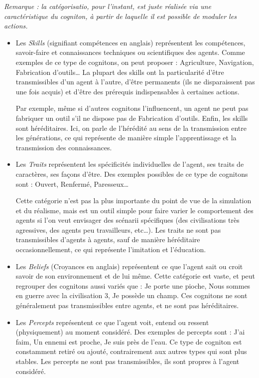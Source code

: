 \documentclass[a4paper,oneside,12 pt]{article}
\begin{document}
	
	\textit{Remarque : la catégorisatio, pour l'instant, est juste réalisée via une caractéristique du cogniton, à partir de laquelle il est possible de moduler les actions.}
\begin{itemize}


\item 	Les\textit{ Skills} (signifiant compétences en anglais) représentent les compétences, savoir-faire et connaissances techniques ou scientifiques des agents. Comme exemples de ce type de cognitons, on peut proposer : Agriculture, Navigation, Fabrication d'outils… La plupart des skills ont la particularité d'être transmissibles d'un agent à l'autre, d'être permanents (ils ne disparaissent pas une fois acquis) et d'être des prérequis indispensables à certaines actions. 
	
	Par exemple, même si d'autres cognitons l'influencent, un agent ne peut pas fabriquer un outil s'il ne dispose pas de Fabrication d'outils. Enfin, les skills sont héréditaires. Ici, on parle de l'hérédité au sens de la transmission entre les générations, ce qui représente de manière simple l'apprentissage et la transmission des connaissances.

\item 	Les \textit{Traits} représentent les spécificités individuelles de l'agent, ses traits de caractères, ses façons d'être. Des exemples possibles de ce type de cognitons sont : Ouvert, Renfermé, Paresseux…
	
	Cette catégorie n'est pas la plus importante du point de vue de la simulation et du réalisme, mais est un outil simple pour faire varier le comportement des agents si l'on veut envisager des scénarii spécifiques (des civilisations très agressives, des agents peu travailleurs, etc…). Les traits ne sont pas transmissibles d'agents à agents, sauf de manière héréditaire occasionnellement, ce qui représente l'imitation et l'éducation.

\item 	Les \textit{Beliefs} (Croyances en anglais) représentent ce que l'agent sait ou croit savoir de son environnement et de lui même. Cette catégorie est vaste, et peut regrouper des cognitons aussi variés que : Je porte une pioche, Nous sommes en guerre avec la civilisation 3, Je possède un champ. Ces cognitons ne sont généralement pas transmissibles entre agents, et ne sont pas héréditaires.

\item 	Les \textit{Percepts} représentent ce que l'agent voit, entend ou ressent (physiquement) au moment considéré. Des exemples de percepts sont : J'ai faim, Un ennemi est proche, Je suis près de l'eau. Ce type de cogniton est constamment retiré ou ajouté, contrairement aux autres types qui sont plus stables. Les percepts ne sont pas transmissibles, ils sont propres à l'agent considéré.


\end{itemize}
\end{document}
